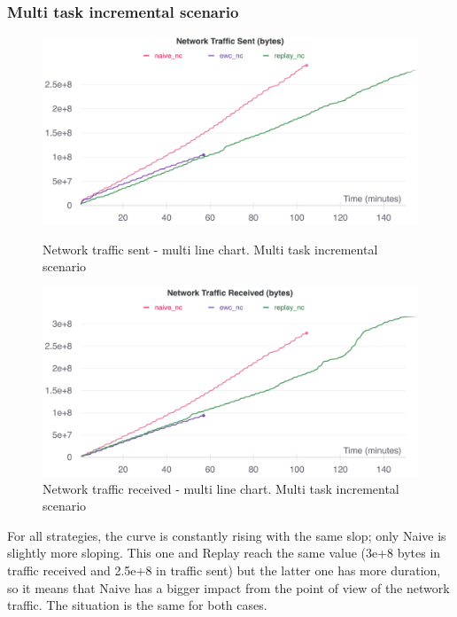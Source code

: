 \documentclass[english, LaM, oneside]{sapthesis}%
\begin{document}
\subsubsection{Multi task incremental scenario}
\begin{figure}[h]
   \begin{minipage}{0.48\textwidth}
     \centering
     \includegraphics[width=1.1\linewidth]{overview network traffic sent nc.png}
     \caption{Network traffic sent - multi line chart. Multi task incremental scenario}\label{Fig:109}
   \end{minipage}\hfill
   \begin{minipage}{0.48\textwidth}
     \centering
     \includegraphics[width=1.1\linewidth]{overview network traffic received nc.png}
     \caption{Network traffic received - multi line chart. Multi task incremental scenario}\label{Fig:110}
   \end{minipage}
\end{figure}



For all strategies, the curve is constantly rising with the same slop; only Naive is slightly more sloping.  This one and Replay reach the same value (3e+8 bytes in traffic received and 2.5e+8 in traffic sent) but the latter one has more duration, so it means that Naive has a bigger impact from the point of view of the network traffic. The situation is the same for both cases.
\end{document}
